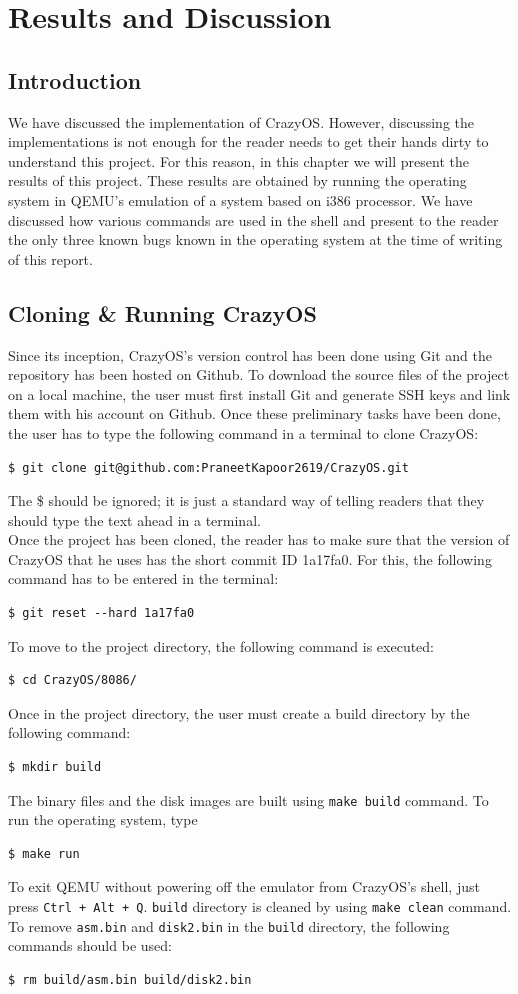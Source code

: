 \chapter{Results and Discussion}
\section{Introduction}
We have discussed the implementation of CrazyOS. However, discussing the implementations is not enough for the reader needs to get their hands dirty to understand this project. For this reason, in this chapter we will present the results of this project. These results are obtained by running the operating system in QEMU's emulation of a system based on i386 processor. We have discussed how various commands are used in the shell and present to the reader the only three known bugs known in the operating system at the time of writing of this report.

\section{Cloning \& Running CrazyOS}
Since its inception, CrazyOS's version control has been done using Git and the repository has been hosted on Github. To download the source files of the project on a local machine, the user must first install Git and generate SSH keys and link them with his account on Github. Once these preliminary tasks have been done, the user has to type the following command in a terminal to clone CrazyOS:
\begin{Verbatim}
$ git clone git@github.com:PraneetKapoor2619/CrazyOS.git
\end{Verbatim} 
The \$ should be ignored; it is just a standard way of telling readers that they should type the text ahead in a terminal.\\
Once the project has been cloned, the reader has to make sure that the version of CrazyOS that he uses has the short commit ID 1a17fa0. For this, the following command has to be entered in the terminal:
\begin{Verbatim}
$ git reset --hard 1a17fa0
\end{Verbatim}
To move to the project directory, the following command is executed:
\begin{Verbatim}
$ cd CrazyOS/8086/
\end{Verbatim}
Once in the project directory, the user must create a build directory by the following command:
\begin{Verbatim}
$ mkdir build
\end{Verbatim}
The binary files and the disk images are built using \texttt{make build} command. To run the operating system, type
\begin{Verbatim}
$ make run
\end{Verbatim}
To exit QEMU without powering off the emulator from CrazyOS's shell, just press \texttt{Ctrl + Alt + Q}. \texttt{build} directory is cleaned by using \texttt{make clean} command. To remove \texttt{asm.bin} and \texttt{disk2.bin} in the \texttt{build} directory, the following commands should be used:
\begin{Verbatim}
$ rm build/asm.bin build/disk2.bin
\end{Verbatim}

